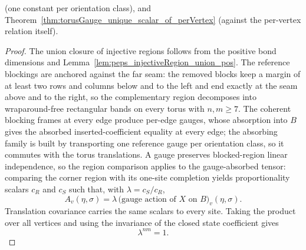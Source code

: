\begin{theorem}
    (one constant per orientation class), and
    Theorem~\ref{thm:torusGauge_unique_scalar_of_perVertex} (against the
    per-vertex relation itself).
    \begin{proof}
        \leanok
        The union closure of injective regions follows from the positive bond
        dimensions and Lemma~\ref{lem:peps_injectiveRegion_union_pos}. The
        reference blockings are anchored against the far seam: the removed
        blocks keep a margin of at least two rows and columns below and to
        the left and end exactly at the seam above and to the right, so the
        complementary region decomposes into wraparound-free rectangular
        bands on every torus with $n,m\geq 7$. The
        coherent blocking frames at every edge produce per-edge gauges, whose
        absorption into $B$ gives the absorbed inserted-coefficient equality at
        every edge; the absorbing family is built by transporting one reference
        gauge per orientation class, so it commutes with the torus
        translations. A gauge preserves blocked-region linear independence, so
        the region comparison applies to the gauge-absorbed tensor: comparing
        the corner region with its one-site completion yields proportionality
        scalars $c_R$ and $c_S$ such that, with $\lambda=c_S/c_R$,
        \[
            A_v(\eta,\sigma)
            =
            \lambda\,
            \bigl(\text{gauge action of }X\text{ on }B\bigr)_v(\eta,\sigma).
        \]
        Translation covariance carries the same scalars to every site. Taking
        the product over all vertices and using the invariance of the closed
        state coefficient gives
        \[
            \lambda^{nm}=1.
        \]
    \end{proof}
\end{theorem}

